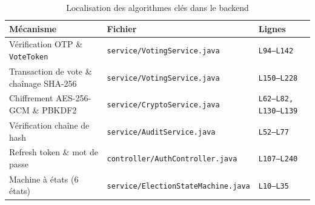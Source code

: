 \begin{table}[H]
\centering
\caption{Localisation des algorithmes clés dans le backend}
\small
\begin{tabularx}{\textwidth}{@{}lXl@{}}
\toprule
\rowcolor{uaszlight}
\textbf{Mécanisme} & \textbf{Fichier} & \textbf{Lignes} \\
\midrule
Vérification OTP \& \texttt{VoteToken} & \texttt{service/VotingService.java} & \texttt{L94--L142} \\
Transaction de vote \& chaînage SHA-256 & \texttt{service/VotingService.java} & \texttt{L150--L228} \\
Chiffrement AES-256-GCM \& PBKDF2 & \texttt{service/CryptoService.java} & \texttt{L62--L82, L130--L139} \\
Vérification chaîne de hash & \texttt{service/AuditService.java} & \texttt{L52--L77} \\
Refresh token \& mot de passe & \texttt{controller/AuthController.java} & \texttt{L107--L240} \\
Machine à états (6 états) & \texttt{service/ElectionStateMachine.java} & \texttt{L10--L35} \\
\bottomrule
\end{tabularx}
\end{table}

